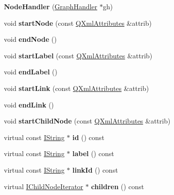 \begin{DoxyCompactItemize}
\item 
\mbox{\label{class_node_handler_a015c75555f24fdb6c766f03d9428395f}} 
{\bfseries Node\+Handler} (\mbox{\hyperlink{class_graph_handler}{Graph\+Handler}} $\ast$gh)
\item 
\mbox{\label{class_node_handler_a5f8dacefb2af9007ee3d52152cffb5f2}} 
void {\bfseries start\+Node} (const \mbox{\hyperlink{class_q_xml_attributes}{Q\+Xml\+Attributes}} \&attrib)
\item 
\mbox{\label{class_node_handler_a78e510777877af3febaa3dad5b3db60d}} 
void {\bfseries end\+Node} ()
\item 
\mbox{\label{class_node_handler_a3da4f2059dd96056ceebff579e165b6f}} 
void {\bfseries start\+Label} (const \mbox{\hyperlink{class_q_xml_attributes}{Q\+Xml\+Attributes}} \&attrib)
\item 
\mbox{\label{class_node_handler_a3bfcccc6a52585bec1c96d2c7e6d7568}} 
void {\bfseries end\+Label} ()
\item 
\mbox{\label{class_node_handler_a38ec6e9b5acafcf54334e1707d88b1c4}} 
void {\bfseries start\+Link} (const \mbox{\hyperlink{class_q_xml_attributes}{Q\+Xml\+Attributes}} \&attrib)
\item 
\mbox{\label{class_node_handler_a8fd52ad97d34cedee8425f0a2e000e3d}} 
void {\bfseries end\+Link} ()
\item 
\mbox{\label{class_node_handler_a90f5dc2ed13c6041f9a833df9a0b1c38}} 
void {\bfseries start\+Child\+Node} (const \mbox{\hyperlink{class_q_xml_attributes}{Q\+Xml\+Attributes}} \&attrib)
\item 
\mbox{\label{class_node_handler_a7b4de9bc3286956f1a0c472bae2da9c9}} 
virtual const \mbox{\hyperlink{class_i_string}{I\+String}} $\ast$ {\bfseries id} () const
\item 
\mbox{\label{class_node_handler_a50429bb61c8fbc0c8cd2b60ca85528aa}} 
virtual const \mbox{\hyperlink{class_i_string}{I\+String}} $\ast$ {\bfseries label} () const
\item 
\mbox{\label{class_node_handler_aabbd123ecf6ca8d54ba515f6d465a754}} 
virtual const \mbox{\hyperlink{class_i_string}{I\+String}} $\ast$ {\bfseries link\+Id} () const
\item 
\mbox{\label{class_node_handler_a2d38d3ef2caa6a960d3cbd1e141ff2a5}} 
virtual \mbox{\hyperlink{class_i_child_node_iterator}{I\+Child\+Node\+Iterator}} $\ast$ {\bfseries children} () const
\end{DoxyCompactItemize}
